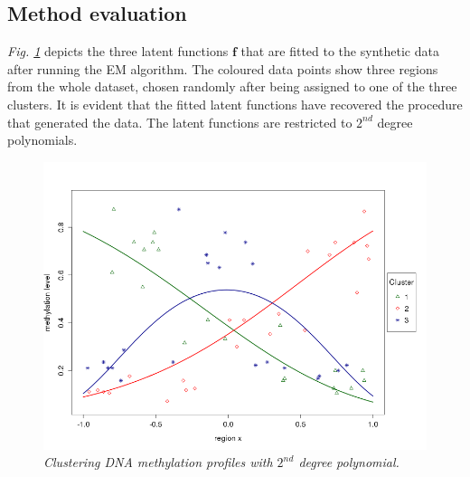 \subsection{Method evaluation} \label{meth-synth-method-subsect}
\emph{Fig. \ref{probit-2nd-pic}} depicts the three latent functions $\mathbf{f}$ that are fitted to the synthetic data after running the EM algorithm. The coloured data points show three regions from the whole dataset, chosen randomly after being assigned to one of the three clusters. It is evident that the fitted latent functions have recovered the procedure that generated the data. The latent functions are restricted to $2^{nd}$ degree polynomials.
\begin{figure}[!ht]
\begin{center}
 \includegraphics[scale = 0.4]{images/probit2nd.png}
\caption{\emph{Clustering DNA methylation profiles with $2^{nd}$ degree polynomial.}}
\label{probit-2nd-pic}
\end{center}
\end{figure}


